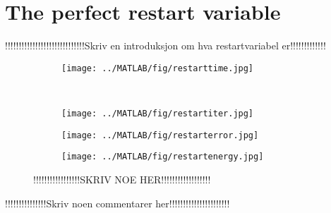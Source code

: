 \chapter{The perfect restart variable}
!!!!!!!!!!!!!!!!!!!!!!!!!!!!!Skriv en introduksjon om hva restartvariabel er!!!!!!!!!!!!!\\
\begin{figure}[H]
        \centering
        \begin{subfigure}[b]{0.45\textwidth}
                \texttt{[image: ../MATLAB/fig/restarttime.jpg]}
                \caption{  }
                \label{fig:restarttime}
        \end{subfigure}
        ~
        \begin{subfigure}[b]{0.45\textwidth}
                \texttt{[image: ../MATLAB/fig/restartiter.jpg]}
                \caption{  }
                \label{fig:restartiter}
        \end{subfigure}
        \begin{subfigure}[b]{0.45\textwidth}
                \texttt{[image: ../MATLAB/fig/restarterror.jpg]}
                \caption{  }
                \label{fig:restarterror}
        \end{subfigure}
        \begin{subfigure}[b]{0.45\textwidth}
                \texttt{[image: ../MATLAB/fig/restartenergy.jpg]}
                \caption{  }
                \label{fig:restartenergy}
        \end{subfigure}
        \caption{ !!!!!!!!!!!!!!!!!SKRIV NOE HER!!!!!!!!!!!!!!!!!!  }
        \label{fig:restart}
\end{figure}
!!!!!!!!!!!!!!!Skriv noen commentarer her!!!!!!!!!!!!!!!!!!!!!!\\
